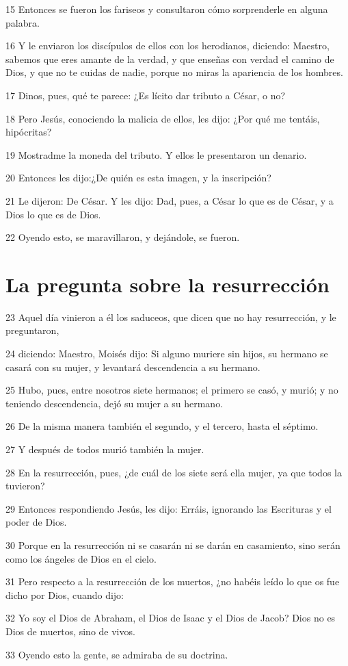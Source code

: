 \par 15 Entonces se fueron los fariseos y consultaron cómo sorprenderle en alguna palabra.
\par 16 Y le enviaron los discípulos de ellos con los herodianos, diciendo: Maestro, sabemos que eres amante de la verdad, y que enseñas con verdad el camino de Dios, y que no te cuidas de nadie, porque no miras la apariencia de los hombres.
\par 17 Dinos, pues, qué te parece: ¿Es lícito dar tributo a César, o no?
\par 18 Pero Jesús, conociendo la malicia de ellos, les dijo: ¿Por qué me tentáis, hipócritas?
\par 19 Mostradme la moneda del tributo. Y ellos le presentaron un denario.
\par 20 Entonces les dijo:¿De quién es esta imagen, y la inscripción?
\par 21 Le dijeron: De César. Y les dijo: Dad, pues, a César lo que es de César, y a Dios lo que es de Dios.
\par 22 Oyendo esto, se maravillaron, y dejándole, se fueron.

\section*{La pregunta sobre la resurrección}

\par 23 Aquel día vinieron a él los saduceos, que dicen que no hay resurrección, y le preguntaron,
\par 24 diciendo: Maestro, Moisés dijo: Si alguno muriere sin hijos, su hermano se casará con su mujer, y levantará descendencia a su hermano.
\par 25 Hubo, pues, entre nosotros siete hermanos; el primero se casó, y murió; y no teniendo descendencia, dejó su mujer a su hermano.
\par 26 De la misma manera también el segundo, y el tercero, hasta el séptimo.
\par 27 Y después de todos murió también la mujer.
\par 28 En la resurrección, pues, ¿de cuál de los siete será ella mujer, ya que todos la tuvieron?
\par 29 Entonces respondiendo Jesús, les dijo: Erráis, ignorando las Escrituras y el poder de Dios.
\par 30 Porque en la resurrección ni se casarán ni se darán en casamiento, sino serán como los ángeles de Dios en el cielo.
\par 31 Pero respecto a la resurrección de los muertos, ¿no habéis leído lo que os fue dicho por Dios, cuando dijo:
\par 32 Yo soy el Dios de Abraham, el Dios de Isaac y el Dios de Jacob? Dios no es Dios de muertos, sino de vivos.
\par 33 Oyendo esto la gente, se admiraba de su doctrina.

